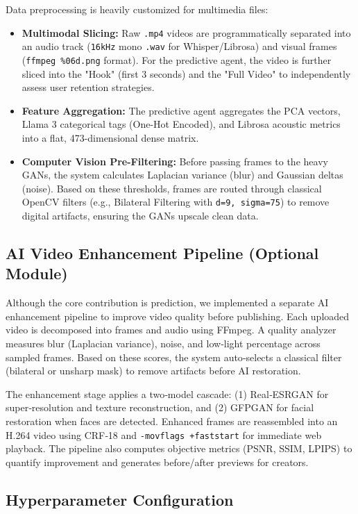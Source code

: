 Data preprocessing is heavily customized for multimedia files:
\begin{itemize}
    \item \textbf{Multimodal Slicing:} Raw \texttt{.mp4} videos are programmatically separated into an audio track (\texttt{16kHz} mono \texttt{.wav} for Whisper/Librosa) and visual frames (\texttt{ffmpeg \%06d.png} format). For the predictive agent, the video is further sliced into the "Hook" (first 3 seconds) and the "Full Video" to independently assess user retention strategies.
    \item \textbf{Feature Aggregation:} The predictive agent aggregates the PCA vectors, Llama 3 categorical tags (One-Hot Encoded), and Librosa acoustic metrics into a flat, 473-dimensional dense matrix. 
    \item \textbf{Computer Vision Pre-Filtering:} Before passing frames to the heavy GANs, the system calculates Laplacian variance (blur) and Gaussian deltas (noise). Based on these thresholds, frames are routed through classical OpenCV filters (e.g., Bilateral Filtering with \texttt{d=9, sigma=75}) to remove digital artifacts, ensuring the GANs upscale clean data.
\end{itemize}
\subsection{AI Video Enhancement Pipeline (Optional Module)}
Although the core contribution is prediction, we implemented a separate AI enhancement pipeline to improve video quality before publishing. Each uploaded video is decomposed into frames and audio using FFmpeg. A quality analyzer measures blur (Laplacian variance), noise, and low‑light percentage across sampled frames. Based on these scores, the system auto‑selects a classical filter (bilateral or unsharp mask) to remove artifacts before AI restoration.

The enhancement stage applies a two‑model cascade: (1) Real‑ESRGAN for super‑resolution and texture reconstruction, and (2) GFPGAN for facial restoration when faces are detected. Enhanced frames are reassembled into an H.264 video using CRF‑18 and \texttt{-movflags +faststart} for immediate web playback. The pipeline also computes objective metrics (PSNR, SSIM, LPIPS) to quantify improvement and generates before/after previews for creators.
\subsection{Hyperparameter Configuration}

